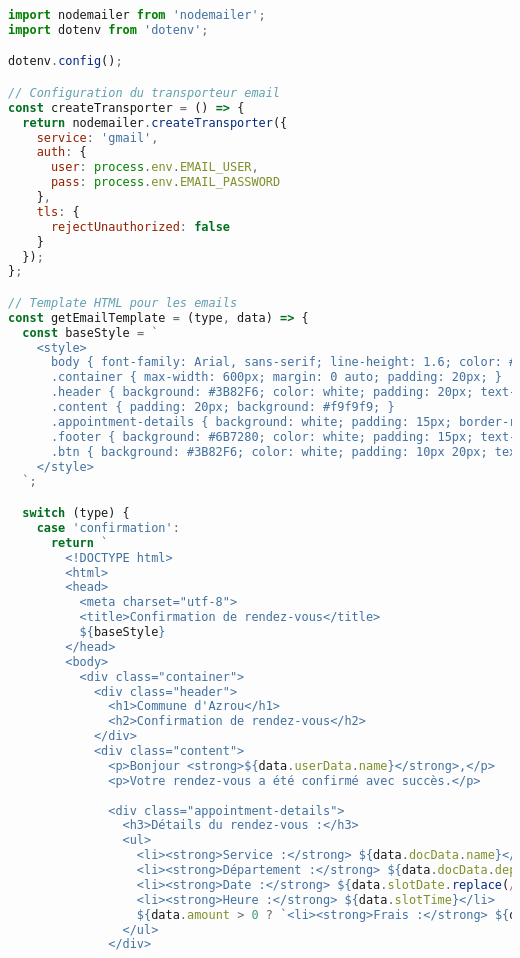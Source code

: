 \begin{lstlisting}[language=JavaScript, caption=emailService.js - Service complet de notifications]
import nodemailer from 'nodemailer';
import dotenv from 'dotenv';

dotenv.config();

// Configuration du transporteur email
const createTransporter = () => {
  return nodemailer.createTransporter({
    service: 'gmail',
    auth: {
      user: process.env.EMAIL_USER,
      pass: process.env.EMAIL_PASSWORD
    },
    tls: {
      rejectUnauthorized: false
    }
  });
};

// Template HTML pour les emails
const getEmailTemplate = (type, data) => {
  const baseStyle = `
    <style>
      body { font-family: Arial, sans-serif; line-height: 1.6; color: #333; }
      .container { max-width: 600px; margin: 0 auto; padding: 20px; }
      .header { background: #3B82F6; color: white; padding: 20px; text-align: center; }
      .content { padding: 20px; background: #f9f9f9; }
      .appointment-details { background: white; padding: 15px; border-radius: 5px; margin: 20px 0; }
      .footer { background: #6B7280; color: white; padding: 15px; text-align: center; font-size: 12px; }
      .btn { background: #3B82F6; color: white; padding: 10px 20px; text-decoration: none; border-radius: 5px; display: inline-block; }
    </style>
  `;

  switch (type) {
    case 'confirmation':
      return `
        <!DOCTYPE html>
        <html>
        <head>
          <meta charset="utf-8">
          <title>Confirmation de rendez-vous</title>
          ${baseStyle}
        </head>
        <body>
          <div class="container">
            <div class="header">
              <h1>Commune d'Azrou</h1>
              <h2>Confirmation de rendez-vous</h2>
            </div>
            <div class="content">
              <p>Bonjour <strong>${data.userData.name}</strong>,</p>
              <p>Votre rendez-vous a été confirmé avec succès.</p>
              
              <div class="appointment-details">
                <h3>Détails du rendez-vous :</h3>
                <ul>
                  <li><strong>Service :</strong> ${data.docData.name}</li>
                  <li><strong>Département :</strong> ${data.docData.department}</li>
                  <li><strong>Date :</strong> ${data.slotDate.replace(/_/g, '/')}</li>
                  <li><strong>Heure :</strong> ${data.slotTime}</li>
                  ${data.amount > 0 ? `<li><strong>Frais :</strong> ${data.amount} MAD</li>` : ''}
                </ul>
              </div>
              

\end{lstlisting}
